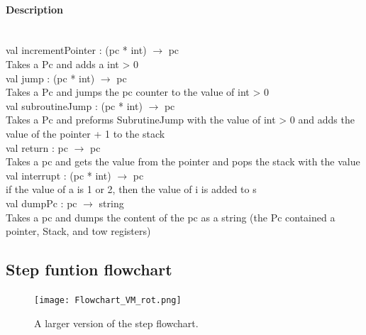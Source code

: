 \documentclass{article}
\begin{document}
\paragraph{Description} \
\\
	val incrementPointer : (pc * int) $\rightarrow$ pc\\
		Takes a Pc and adds a int > 0\\
	val jump : (pc * int) $\rightarrow$ pc\\
		Takes a Pc and jumps the pc counter to the value of int > 0\\
	val subroutineJump : (pc * int) $\rightarrow$ pc\\
		Takes a Pc and preforms SubrutineJump with the value of  int > 0 and adds the  value of the pointer + 1 to the stack\\
	val return : pc $\rightarrow$ pc\\
    	Takes a pc and gets the value from the pointer and pops the stack with the value\\
	val interrupt : (pc * int) $\rightarrow$ pc\\
		if the value of a is 1 or 2, then the value of i is added to s\\
	val dumpPc : pc $\rightarrow$ string\\
		Takes a pc and dumps the content of the pc as a string (the Pc contained a pointer, Stack, and tow registers)\\
\subsection{Step funtion flowchart}
\begin{figure}[H]
\begin{centering}
\texttt{[image: Flowchart\_VM\_rot.png]}
\caption{A larger version of the step flowchart.}
\end{centering}
\end{figure}
\end{document}
